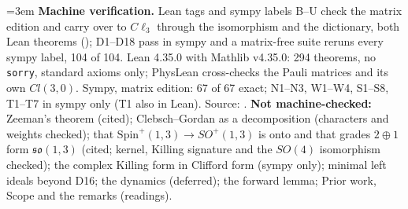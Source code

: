 \documentclass[10pt]{article}
\newcommand{\Cl}{C\ell_3}
\newcommand{\Spin}{\mathrm{Spin}}
\newcommand{\lean}[1]{\texttt{\detokenize{#1}}}
\begin{document}
\vspace{2pt}
{\footnotesize
\emergencystretch=3em \textbf{Machine verification.} Lean tags and sympy labels B--U check the matrix edition and carry over to $\Cl$ through the isomorphism and the dictionary, both Lean theorems (\lean{dict_N}); D1--D18 pass in sympy and a matrix-free suite reruns every sympy label, 104 of 104. Lean 4.35.0 with Mathlib v4.35.0: 294 theorems, no \texttt{sorry}, standard axioms only; PhysLean cross-checks the Pauli matrices and its own $Cl(3,0)$. Sympy, matrix edition: 67 of 67 exact; N1--N3, W1--W4, S1--S8, T1--T7 in sympy only (T1 also in Lean). Source: \texttt{}.
\textbf{Not machine-checked:} Zeeman's theorem (cited); Clebsch--Gordan as a decomposition (characters and weights checked); that $\Spin^+(1,3)\to SO^+(1,3)$ is onto and that grades $2\oplus1$ form $\mathfrak{so}(1,3)$ (cited; kernel, Killing signature and the $SO(4)$ isomorphism checked); the complex Killing form in Clifford form (sympy only); minimal left ideals beyond D16; the dynamics (deferred); the forward lemma; Prior work, Scope and the remarks (readings).\par}
\end{document}
